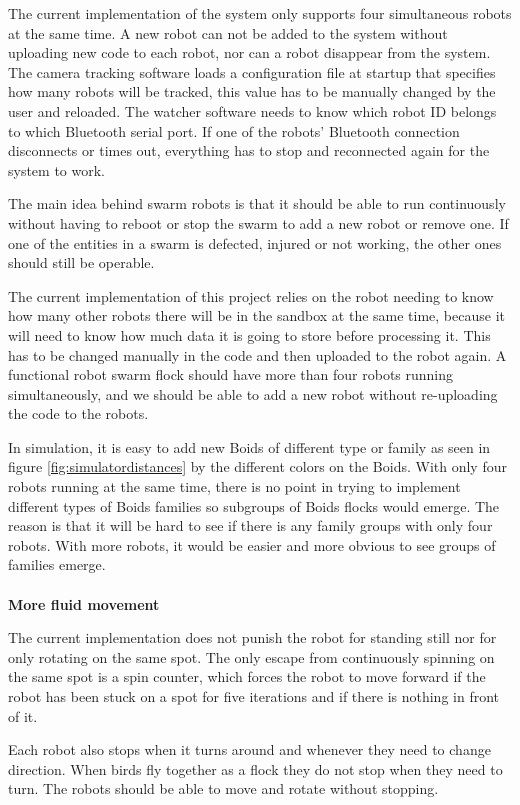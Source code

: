 The current implementation of the system only supports four simultaneous robots at the same time. A new robot can not be added to the system without uploading new code to each robot, nor can a robot disappear from the system. The camera tracking software loads a configuration file at startup that specifies how many robots will be tracked, this value has to be manually changed by the user and reloaded.
The watcher software needs to know which robot ID belongs to which Bluetooth serial port. If one of the robots' Bluetooth connection disconnects or times out, everything has to stop and reconnected again for the system to work.

The main idea behind swarm robots is that it should be able to run continuously without having to reboot or stop the swarm to add a new robot or remove one. If one of the entities in a swarm is defected, injured or not working, the other ones should still be operable.

The current implementation of this project relies on the robot needing to know how many other robots there will be in the sandbox at the same time, because it will need to know how much data it is going to store before processing it. This has to be changed manually in the code and then uploaded to the robot again.
A functional robot swarm flock should have more than four robots running simultaneously, and we should be able to add a new robot without re-uploading the code to the robots.

In simulation, it is easy to add new Boids of different type or family as seen in figure \ref{fig:simulatordistances} by the different colors on the Boids. With only four robots running at the same time, there is no point in trying to implement different types of Boids families so subgroups of Boids flocks would emerge. The reason is that it will be hard to see if there is any family groups with only four robots. With more robots, it would be easier and more obvious to see groups of families emerge. \\\\
\textbf{More fluid movement}

The current implementation does not punish the robot for standing still nor for only rotating on the same spot. The only escape from continuously spinning on the same spot is a spin counter, which forces the robot to move forward if the robot has been stuck on a spot for five iterations and if there is nothing in front of it. 

Each robot also stops when it turns around and whenever they need to change direction. When birds fly together as a flock they do not stop when they need to turn. The robots should be able to move and rotate without stopping.

